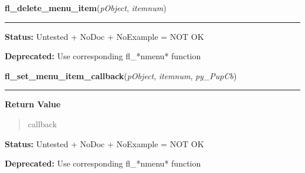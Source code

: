     \label{xformslib:deprecated:fl_delete_menu_item}

    \vspace{0.5ex}

\hspace{.8\funcindent}\begin{boxedminipage}{\funcwidth}

    \raggedright \textbf{fl\_delete\_menu\_item}(\textit{pObject}, \textit{itemnum})

    \vspace{-1.5ex}

    \rule{\textwidth}{0.5\fboxrule}
\setlength{\parskip}{2ex}
\setlength{\parskip}{1ex}
\textbf{Status:} Untested + NoDoc + NoExample = NOT OK



\textbf{Deprecated:} Use corresponding fl\_*nmenu* function



    \end{boxedminipage}

    \label{xformslib:deprecated:fl_set_menu_item_callback}

    \vspace{0.5ex}

\hspace{.8\funcindent}\begin{boxedminipage}{\funcwidth}

    \raggedright \textbf{fl\_set\_menu\_item\_callback}(\textit{pObject}, \textit{itemnum}, \textit{py\_PupCb})

    \vspace{-1.5ex}

    \rule{\textwidth}{0.5\fboxrule}
\setlength{\parskip}{2ex}
\setlength{\parskip}{1ex}
      \textbf{Return Value}
    \vspace{-1ex}

      \begin{quote}
      callback

      \end{quote}

\textbf{Status:} Untested + NoDoc + NoExample = NOT OK



\textbf{Deprecated:} Use corresponding fl\_*nmenu* function



    \end{boxedminipage}

